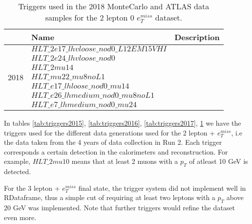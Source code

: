 \begin{table}
    \centering
    \caption[2018 triggers table]{Triggers used in the 2018 MonteCarlo and ATLAS data samples for the 2 lepton 0 $e_T^{miss}$ dataset.}
    \label{tab:triggers2018}
    \begin{tabular}{|l|l|l|}
    \hline
                            & Name & Description \\ \hline
    \multirow{7}{*}{2018} & $HLT\_2e17\_lhvloose\_nod0\_L12EM15VHI$      &             \\ \cline{2-3} 
                            & $HLT\_2e24\_lhvloose\_nod0$        &             \\ \cline{2-3} 
                            & $HLT\_2mu14$     &             \\ \cline{2-3} 
                            &  $HLT\_mu22\_mu8noL1$     &             \\ \cline{2-3} 
                            &  $HLT\_e17\_lhloose\_nod0\_mu14$   &             \\ \cline{2-3} 
                            &   $HLT\_e26\_lhmedium\_nod0\_mu8noL1$    &             \\ \cline{2-3} 
                            
                            & $HLT\_e7\_lhmedium\_nod0\_mu24$    & \\ \hline
    \end{tabular}
    \end{table}


In tables \ref{tab:triggers2015}, \ref{tab:triggers2016}, \ref{tab:triggers2017}, \ref{tab:triggers2018} we have the triggers used for
the different data generations used for the 2 lepton + $e_T^{miss}$, i.e the data taken from the 4 years of data collection in Run 2. 
Each trigger corresponds a certain detection in the calorimeters and reconstruction. For example, $HLT\_2mu10$ means that at least 2 muons 
with a $p_T$ of atleast 10 GeV is detected. \par 
For the 3 lepton + $e_T^{miss}$ final state, the trigger system did not implement well in RDataframe, thus a simple cut of requiring 
at least two leptons with a $p_T$ above 20 GeV was implemented. Note that further triggers would refine the dataset even more. 


\newpage





